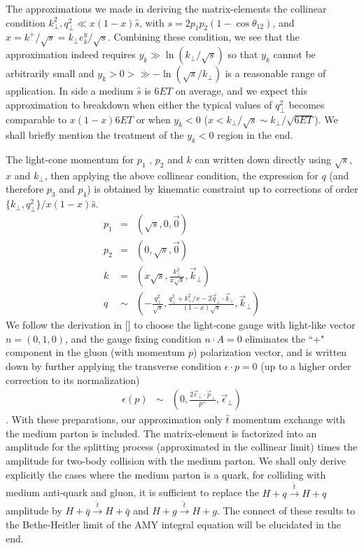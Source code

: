 The approximations we made in deriving the matrix-elements the collinear condition $k_\perp^2, q_\perp^2 \ll x(1-x) \hat{s}$, with $s = 2p_1p_2(1-\cos\theta_{12})$, and $x = k^+/\sqrt{s} = k_\perp e^y_k /\sqrt{s}$.
Combining these condition, we see that the approximation indeed requires $y_k \gg \ln(k_\perp/\sqrt{s})$ so that $y_k$ cannot be arbitrarily small and $y_k>0>\gg -\ln(\sqrt{s}/k_\perp)$ is a reasonable range of application.
In side a medium $\hat{s}$ is $6 ET$ on average, and we expect this approximation to breakdown when either the typical values of $q_\perp^2$ becomes comparable to $x(1-x)6ET$ or when $y_k<0$ ($x < k_\perp/\sqrt{s} \sim k_\perp/\sqrt{6ET}$).
We shall briefly mention the treatment of the $y_k<0$ region in the end.

The light-cone momentum for $p_1$ , $p_2$ and $k$ can written down directly using $\sqrt{s}$, $x$ and $k_\perp$, then applying the above collinear condition, the expression for $q$ (and therefore $p_3$ and $p_4$) is obtained by kinematic constraint up to corrections of order $\{k_\perp, q_\perp^2\}/x(1-x)\hat{s}$.
\begin{eqnarray}
p_1 &=& (\sqrt{s}, 0, \vec{0})\\
p_2 &=& (0, \sqrt{s}, \vec{0})\\
k &=& (x\sqrt{s}, \frac{k_\perp^2}{x\sqrt{s}}, \vec{k}_\perp)\\
q &\sim& (-\frac{q_\perp^2}{\sqrt{s}}, \frac{q_\perp^2 + k_\perp^2/x - 
2\vec{q}_\perp \cdot \vec{k}_\perp}{(1-x)\sqrt{s}}, \vec{k}_\perp)
\end{eqnarray}
We follow the derivation in [] to choose the light-cone gauge with light-like vector $n = (0, 1, 0)$, and the gauge fixing condition $n\cdot A =0$ eliminates the ``+" component in the gluon (with momentum $p$) polarization vector, and is written down by further applying the transverse condition $\epsilon \cdot p = 0$ (up to a higher order correction to its normalization)
\begin{eqnarray}
\epsilon(p) &\sim& (0, \frac{2\vec{\epsilon}_\perp\cdot\vec{p}_\perp}{p^+}, \vec{\epsilon}_\perp)
\end{eqnarray}.
With these preparations, our approximation only $\hat{t}$ momentum exchange with the medium parton is included.
The matrix-element is factorized into an amplitude for the splitting process (approximated in the collinear limit) times the amplitude for two-body collision with the medium parton.
We shall only derive explicitly the cases where the medium parton is a quark, for colliding with medium anti-quark and gluon, it is sufficient to replace the $H+q\xrightarrow{\hat{t}} H+q$ amplitude by $H+\bar{q}\xrightarrow{\hat{t}} H+\bar{q}$ and $H+g\xrightarrow{\hat{t}} H+g$.
The connect of these results to the Bethe-Heitler limit of the AMY integral equation will be elucidated in the end.

